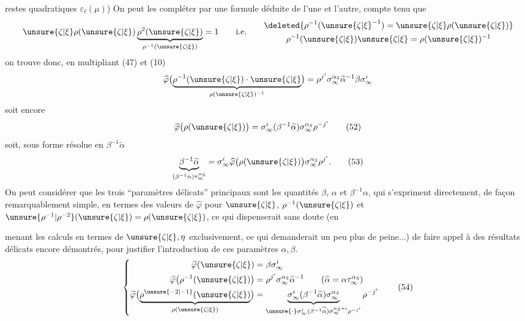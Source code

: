 restes quadratiques $\varepsilon_\ell(\mu)$) On peut les compléter par une formule déduite de l'une et  l'autre, compte tenu que
\[
\unsure{\zeta|\xi}\rho(\unsure{\zeta|\xi})\underbrace{\rho^2(\unsure{\zeta|\xi})}_{\rho^{-1}(\unsure{\zeta|\xi})}=1
\qquad\text{i.e.}\qquad
\begin{gathered}
\deleted{\rho^{-1}(\unsure{\zeta|\xi}^{-1})=\unsure{\zeta|\xi}\rho(\unsure{\zeta|\xi})}\\
\rho^{-1}(\unsure{\zeta|\xi})\unsure{\zeta|\xi}=\rho(\unsure{\zeta|\xi})^{-1}
\end{gathered}
\]
on trouve donc, en multipliant (47) et (10)
\[
\widehat{\varphi}\bigl(\underbrace{\rho^{-1}(\unsure{\zeta|\xi})\cdot\unsure{\zeta|\xi}}_{\rho(\unsure{\zeta|\xi})^{-1}}\bigr)
=\rho^{j'}\sigma_\infty^{\alpha_3}\widetilde\alpha^{-1}\beta\sigma_\infty^i
\]
soit encore
\[
\widehat{\varphi}\bigl(\rho(\unsure{\zeta|\xi})\bigr)
=\sigma_\infty^i(\beta^{-1}\widetilde\alpha)\sigma_\infty^{\alpha_3}\rho^{-j'}
\tag{52}
\]
soit, sous forme résolue en $\beta^{-1}\widetilde\alpha$
\[
\underbrace{\beta^{-1}\widetilde\alpha}_{(\beta^{-1}\alpha)\tau_\infty^{\alpha_3}}
=\sigma_\infty^i\widehat{\varphi}\bigl(\rho(\unsure{\zeta|\xi})\bigr)\sigma_\infty^{\alpha_3}\rho^{j'}.
\tag{53}
\]
On peut considérer que les trois ``paramètres délicats'' principaux sont les quantités $\beta$, $\alpha$ et $\beta^{-1}\alpha$, qui s'expriment directement, de façon remarquablement simple, en termes des valeurs de $\widehat{\varphi}$ pour $\unsure{\zeta|\xi}$, $\rho^{-1}(\unsure{\zeta|\xi})$ et $\unsure{\rho^{-1}|\rho^{-2}}(\unsure{\zeta|\xi})=\rho(\unsure{\zeta|\xi})$, ce qui dispenserait  sans doute (en


menant les calculs en termes de $\unsure{\zeta|\xi},\eta$ exclusivement, ce qui demanderait un peu plus de peine...) de faire appel à des résultats délicats  encore démontrés,  pour justifier l'introduction de ces paramètres $\alpha,\beta$.
\[
\left\{
\begin{aligned}
\widehat{\varphi}(\unsure{\zeta|\xi})&=\beta\sigma_\infty^i\\
\widehat{\varphi}\bigl(\rho^{-1}(\unsure{\zeta|\xi})\bigr)&=\rho^{j'}\sigma_\infty^{\alpha_3}\widetilde\alpha^{-1}
\qquad(\widetilde\alpha=\alpha\tau_\infty^{\alpha_3})\\
\widehat{\varphi}\bigl(\underbrace{\rho^{\unsure{-2|-1}}(\unsure{\zeta|\xi})}_{\rho(\unsure{\zeta|\xi})}\bigr)
&=\underbrace{\sigma_\infty^i(\beta^{-1}\widetilde\alpha)\sigma_\infty^{\alpha_3}}_{\unsure{\cdot}\sigma_\infty^i(\beta^{-1}\widetilde\alpha)\sigma_\infty^{\alpha_3+i}\rho^{-j'}}\rho^{-j'}
\end{aligned}
\right.
\tag{54}
\]

